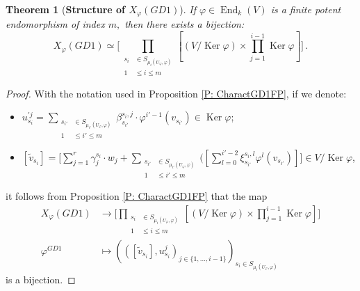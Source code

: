 \documentclass[10pt,a4paper]{amsart}
\newtheorem{thm}[defn]{Theorem}
\theoremstyle{plain}
\theoremstyle{remark}
\numberwithin{equation}{section} \numberwithin{defn}{section}
\newcommand\ed{\operatorname{End}}
\newcommand\Ker{\operatorname{Ker}}
\newcommand{\f}{\varphi}
\begin{document}
\begin{thm}[\textbf{Structure of $X_{\f}(GD1)$}]\label{T: EstructuraGD1}
If $\f\in \ed_k(V)$ is a finite potent endomorphism of index $m,$ then there exists a bijection: \begin{equation} X_\varphi (GD1) \simeq \big [\underset {\begin{aligned} s_i &\in S_{{\mu}_i (U_\varphi, \varphi)} \\ 1 &\leq i \leq m \end{aligned}} {\prod} [(V/\Ker \varphi) \times \prod_{j= 1}^{i-1} \Ker \varphi] \big ]\, .\end{equation}
\end{thm}
\begin{proof}
With the notation used in Proposition \ref{P: CharactGD1FP}, if we denote:

\begin{itemize}


\item $u_{s_i}^{'j} = \underset {\begin{aligned} s_{i'} &\in S_{{\mu}_{i'} (U_\varphi, \varphi)} \\ 1 &\leq i' \leq m \end{aligned}} \sum \beta_{s_{i'}}^{s_i,j}\cdot \varphi^{i'-1} ({ {v_{s_{i'}}}}) \in \Ker \varphi$;

\bigskip

\item $[{\tilde v}_{s_i}] = \big [\sum_{j=1}^r \gamma_j^{s_i}\cdot w_j +  \underset {\begin{aligned} s_{i'} &\in S_{{\mu}_{i' } (U_\varphi, \varphi)} \\ 1 &\leq i' \leq m \end{aligned}} \sum \big ( [\sum_{l=0}^{i'-2} \xi_{s_{i'}}^{s_i,l} \varphi^{l} ({{v_{s_{i'}}}})] \big ] \in V/\Ker \varphi$,
\end{itemize}\noindent

it follows from Proposition \ref{P: CharactGD1FP} that the map $$\begin{aligned} X_\varphi (GD1) &\longrightarrow \big [\underset {\begin{aligned} s_i &\in S_{{\mu}_i (U_\varphi, \varphi)} \\ 1 &\leq i \leq m \end{aligned}} {\prod} [(V/\Ker \varphi) \times \prod_{j= 1}^{i-1} \Ker \varphi] \big ] \\ \f^{GD1} &\longmapsto (([{\tilde v}_{s_i}], u_{s_i}^j)_{ j\in \{1, \dots, i-1\}})_{s_i \in S_{{\mu}_i (U_\varphi, \varphi)}}\end{aligned}$$\noindent is a bijection.
\end{proof}
\end{document}
